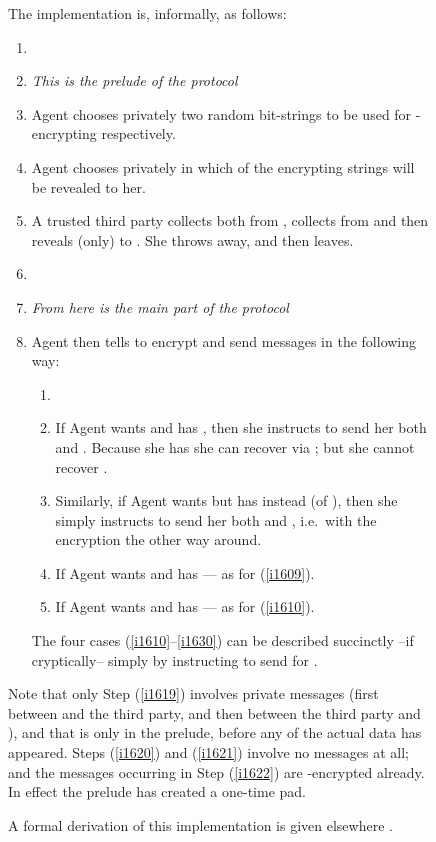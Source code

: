 \documentclass[runningheads]{llncs}
\newenvironment{Figure}[2][t]{\begin{figure}[#1]\def\Label{#2}\small}{\label{\Label}\end{figure}}
\newcommand\Itm[1] {(\ref{#1})}
\begin{document}
\begin{Figure}[ht!]{f1228}
\medskip
The implementation is, informally, as follows:
\begin{enumerate}
\item[]~
\item[] \hrulefill\textit{This is the prelude of the protocol}\hrulefill
\item\label{i1620} Agent  chooses privately two random bit-strings  to be used for -encrypting  respectively.
\item\label{i1621} Agent  chooses privately in  which of the encrypting strings  will be revealed to her.
\item\label{i1619} A trusted third party collects both  from , collects  from  and then reveals (only)  to . She throws  away, and then leaves.
\item[]~
\item[] \hrulefill\textit{From here is the main part of the protocol}\hrulefill
\item\label{i1622} Agent  then tells  to encrypt and send messages in the following way:
\begin{enumerate}
\item[]~
\item\label{i1610} If Agent  wants  and has , then she instructs  to send her both  and . Because she has  she can recover  via ; but she cannot recover .
\item\label{i1609} Similarly, if Agent  wants  but has  instead (of ), then she simply instructs  to send her both  and , i.e.\ with the encryption the other way around.
\item If Agent  wants  and has  --- as for \Itm{i1609}.
\item\label{i1630} If Agent  wants  and has  --- as for \Itm{i1610}.
\end{enumerate}

The four cases (\ref{i1610}--\ref{i1630}) can be described succinctly --if cryptically-- simply by instructing  to send  for .
\end{enumerate}
Note that only Step \Itm{i1619} involves private messages (first between  and the third party, and then between the third party and ), and that is only in the prelude, before any of the actual data  has appeared. Steps \Itm{i1620} and \Itm{i1621} involve no messages at all; and the messages occurring in Step \Itm{i1622} are -encrypted already. In effect the prelude has created a one-time pad.

A formal derivation of this implementation is given elsewhere \cite{Morgan:07}.


\end{Figure}
\end{document}

